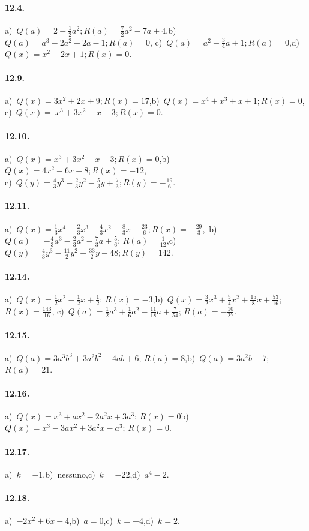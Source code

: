 \paragraph{12.4.}
a)~$Q(a)=2-\frac{1}{2}a^{2}; R(a)=\frac{7}{2}a^{2}-7a+4$,\quad b)~$Q(a)=a^{3}-2a^{2}+2a-1; R(a)=0$,\quad
c)~$Q(a)=a^{2}-\frac{3}{4}a+1; R(a)=0$,\quad d)~$Q(x)=x^{2}-2x+1; R(x)=0$.
\paragraph{12.9.}
a)~$Q(x)=3x^{2}+2x+9; R(x)=17$,\quad b)~$Q(x)=x^{4}+x^{3}+x+1; R(x)=0$, \protect\\ c)~$Q(x)=~x^{3}+3x^{2}-x-3; R(x)=0$.
\paragraph{12.10.}
a)~$Q(x)=x^{3}+3x^{2}-x-3; R(x)=0$,\quad b)~$Q(x)=4x^{2}-6x+8; R(x)=-12$,\protect\\ c)~$Q(y)=\frac{4}{3}y^{3}-\frac{2}{3}y^{2}-\frac{5}{3}y+\frac{7}{3}; R(y)=-\frac{19}{6}$.
\paragraph{12.11.}
a)~$Q(x)=\frac{1}{3}x^{4}-\frac{2}{3}x^{3}+\frac{4}{3}x^{2}-\frac{8}{3}x+\frac{23}{6}; R(x)=-\frac{29}{3}$,
\,b)~$Q(a)=~{-\frac{4}{3}a^{3}-\frac{2}{3}a^{2}-\frac{7}{3}a+\frac{5}{6}}$; $R(a)=\frac{1}{12}$,\quad c)~$Q(y)=\frac{4}{3}y^{3}-\frac{11}{2}y^{2}+\frac{33}{2}y-48; R(y)=142$.
\paragraph{12.14.}
a)~$Q(x)=\frac{1}{2}x^{2}-\frac{1}{2}x+\frac{1}{2}$; $R(x)=-3$,\quad b)~$Q(x)=\frac{3}{2}x^{3}+\frac{5}{4}x^{2}+\frac{15}{8}x+\frac{53}{16}$; $R(x)=\frac{143}{16}$,
\quad c)~$Q(a)=\frac{1}{2}a^{3}+\frac{1}{6}a^{2}-\frac{11}{18}a+\frac{7}{54}$; $R(a)=-{\frac{10}{27}}$.
\paragraph{12.15.}
a)~$Q(a)=3a^{3}b^{3}+3a^{2}b^{2}+4ab+6$; $R(a)=8$,\quad b)~$Q(a)=3a^{2}b+7$; $R(a)=21$.
\paragraph{12.16.}
a)~$Q(x)=x^{3}+ax^{2}-2a^{2}x+3a^{3}$; $R(x)=0$\quad b)~$Q(x)=x^3-3ax^2+3a^2 x-a^3$; $R(x)=0$.
\paragraph{12.17.}
a)~$k=-1$,\quad b)~nessuno,\quad c)~$k=-22$,\quad d)~$a^{4}-2$.
\paragraph{12.18.}
a)~$-2x^2+6x-4$,\quad b)~$a=0$,\quad c)~$k=-4$,\quad d)~$k=2$.